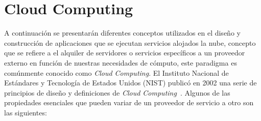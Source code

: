 \section{Cloud Computing}\label{sec:cloud}
A continuación se presentarán diferentes conceptos utilizados en el diseño y construcción de aplicaciones que se ejecutan servicios alojados la nube, concepto que se refiere a el alquiler de servidores o servicios específicos a un proveedor externo en función de nuestras necesidades de cómputo, este paradigma es comúnmente conocido como \emph{Cloud Computing}. El Instituto Nacional de Estándares y Tecnología de Estados Unidos (NIST) publicó en 2002 una serie de principios de diseño y definiciones de \emph{Cloud Computing}~\cite{cloudfunds}. Algunos de las propiedades esenciales que pueden variar de un proveedor de servicio a otro son las siguientes:

